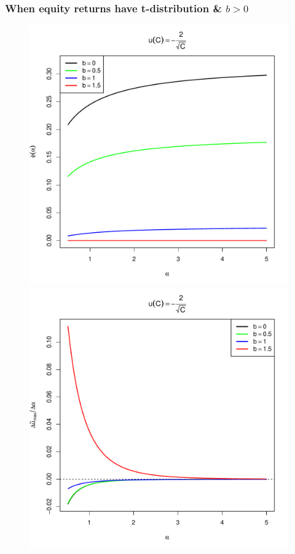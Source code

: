 \documentclass{beamer}
\begin{document}
\begin{frame}
  \frametitle{When equity returns have t-distribution \& $b > 0$}
  \begin{minipage}[t]{0.5\linewidth}
    \begin{figure}[htb!]
      \begin{minipage}{0.5\linewidth}
        \includegraphics[width=\textwidth]{phi_hat_b_t_power.pdf}
      \end{minipage}\hfill
      \begin{minipage}{0.5\linewidth}
        \includegraphics[width=\textwidth]{U_b_t_power.pdf}

\end{minipage}
\end{figure}
\end{minipage}
\end{frame}
\end{document}

